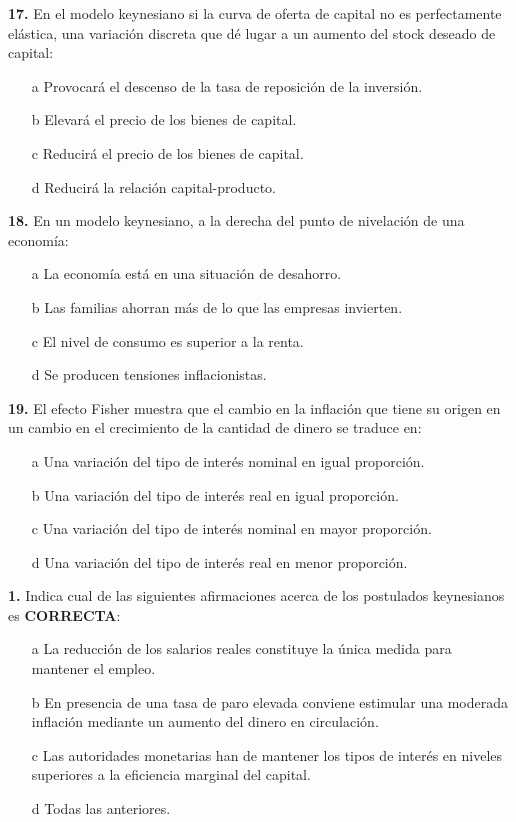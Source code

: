 \documentclass{nuevotema}
\begin{document}
\textbf{17.} En el modelo keynesiano si la curva de oferta de capital no es perfectamente elástica, una variación discreta que dé lugar a un aumento del stock deseado de capital:
\begin{enumerate}
	\item[a] Provocará el descenso de la tasa de reposición de la inversión.
	\item[b] Elevará el precio de los bienes de capital.
	\item[c] Reducirá el precio de los bienes de capital.
	\item[d] Reducirá la relación capital-producto.
\end{enumerate}

\textbf{18.} En un modelo keynesiano, a la derecha del punto de nivelación de una economía:

\begin{enumerate}
	\item[a] La economía está en una situación de desahorro.
	\item[b] Las familias ahorran más de lo que las empresas invierten.
	\item[c] El nivel de consumo es superior a la renta.
	\item[d] Se producen tensiones inflacionistas.
\end{enumerate}

\textbf{19.} El efecto Fisher muestra que el cambio en la inflación que tiene su origen en un cambio en el crecimiento de la cantidad de dinero se traduce en:

\begin{enumerate}
	\item[a] Una variación del tipo de interés nominal en igual proporción.
	\item[b] Una variación del tipo de interés real en igual proporción.
	\item[c] Una variación del tipo de interés nominal en mayor proporción.
	\item[d] Una variación del tipo de interés real en menor proporción.
\end{enumerate}


\textbf{1.} Indica cual de las siguientes afirmaciones acerca de los postulados keynesianos es \textbf{CORRECTA}:

\begin{enumerate}
	\item[a] La reducción de los salarios reales constituye la única medida para mantener el empleo.
	\item[b] En presencia de una tasa de paro elevada conviene estimular una moderada inflación mediante un aumento del dinero en circulación.
	\item[c] Las autoridades monetarias han de mantener los tipos de interés en niveles superiores a la eficiencia marginal del capital.
	\item[d] Todas las anteriores.
\end{enumerate}
\end{document}
